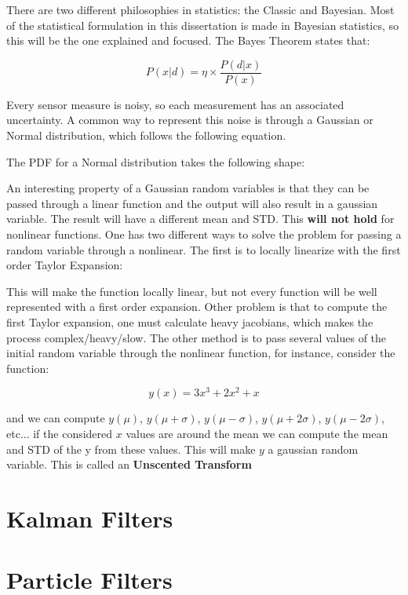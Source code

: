 There are two different philosophies in statistics: the Classic and Bayesian. Most of the statistical formulation in this dissertation is made in Bayesian statistics, so this will be the one explained and focused. The Bayes Theorem states that:

\begin{equation}
    P(x|d) = \eta \times \frac{P(d|x)}{P(x)}
\end{equation}


Every sensor measure is noisy, so each measurement has an associated uncertainty. A common way to represent this noise is through a Gaussian or Normal distribution, which follows the following equation.



The \acl*{PDF} for a Normal distribution takes the following shape:


An interesting property of a Gaussian random variables is that they can be passed through a linear function and the output will also result in a gaussian variable. The result will have a different mean and \acs*{STD}. This \textbf{will not hold} for nonlinear functions. One has two different ways to solve the problem for passing a random variable through a nonlinear. The first is to locally linearize with the first order Taylor Expansion:



This will make the function locally linear, but not every function will be well represented with a first order expansion. Other problem is that to compute the first Taylor expansion, one must calculate heavy jacobians, which makes the process complex/heavy/slow.
The other method is to pass several values of the initial random variable through the nonlinear function, for instance, consider the function:

\begin{equation}
    y(x) = 3x^3 + 2x^2 + x
\end{equation}

and we can compute $y(\mu)$, $y(\mu+\sigma)$, $y(\mu-\sigma)$, $y(\mu+2\sigma)$, $y(\mu-2\sigma)$, etc... if the considered $x$ values are around the mean we can compute the mean and \acs*{STD} of the y from these values. This will make $y$ a gaussian random variable. This is called an \textbf{Unscented Transform}


\section{Kalman Filters}



\section{Particle Filters}
